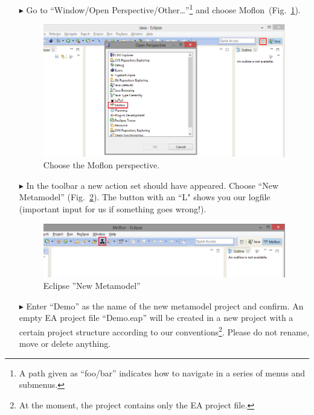 \begin{enumerate}
\item[$\blacktriangleright$] Go to ``Window/Open Perspective/Other\ldots''\footnote{A path given as ``foo/bar'' indicates how to navigate in a series of menus and submenus.} and choose Moflon~(Fig.~\ref{fig_eclipse}). 
\begin{figure}[htbp]
	\centering
  \includegraphics[width=\textwidth]{../installation_images/eclipse_firststart.png}
	\caption{Choose the Moflon perspective.}
	\label{fig_eclipse}
\end{figure}

\item[$\blacktriangleright$] In the toolbar a new action set should have appeared. Choose ``New Metamodel'' (Fig.~\ref{fig_eclipseNewMetamodel}).
The button with an ``L" shows you our logfile (important input for us if something goes wrong!).
\begin{figure}[htbp]
	\centering
  \includegraphics[width=\textwidth]{../installation_images/eclipse_metamodelButton.png}
	\caption{Eclipse ''New Metamodel''}
	\label{fig_eclipseNewMetamodel}
\end{figure}

\item[$\blacktriangleright$] Enter ``Demo'' as the name of the new metamodel project and confirm. 
An empty EA project file ``Demo.eap'' will be created in a new project with a certain project structure according to our conventions\footnote{At the moment, the project contains only the EA project file.}.
Please do not rename, move or delete anything.


\end{enumerate}
